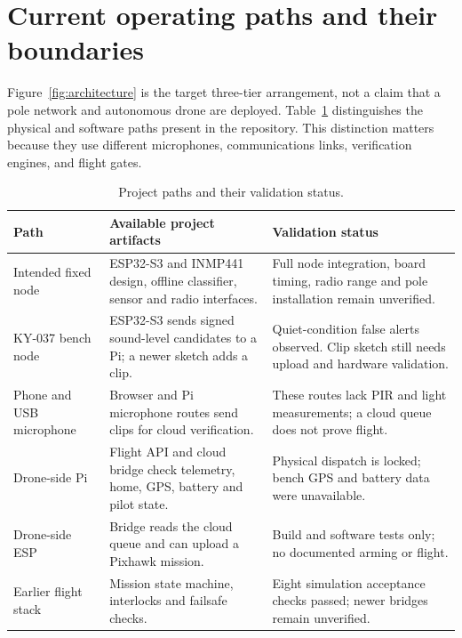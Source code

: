 \documentclass[12pt,a4paper]{report}
\begin{document}
\section{Current operating paths and their boundaries}
\label{sec:current-paths}

Figure~\ref{fig:architecture} is the target three-tier arrangement,
not a claim that a pole network and autonomous drone are deployed.
Table~\ref{tab:pathstatus} distinguishes the physical and software
paths present in the repository. This distinction matters because
they use different microphones, communications links, verification
engines, and flight gates.

\begin{table}[H]
\centering\small
\caption{Project paths and their validation status.}
\label{tab:pathstatus}
\begin{tabular}{|>{\raggedright\arraybackslash}p{}|>{\raggedright\arraybackslash}p{}|>{\raggedright\arraybackslash}p{}|}
\hline
\textbf{Path} & \textbf{Available project artifacts} & \textbf{Validation status}\\\hline
Intended fixed node & ESP32-S3 and INMP441 design, offline classifier, sensor and radio interfaces. & Full node integration, board timing, radio range and pole installation remain unverified.\\\hline
KY-037 bench node & ESP32-S3 sends signed sound-level candidates to a Pi; a newer sketch adds a clip. & Quiet-condition false alerts observed. Clip sketch still needs upload and hardware validation.\\\hline
Phone and USB microphone & Browser and Pi microphone routes send clips for cloud verification. & These routes lack PIR and light measurements; a cloud queue does not prove flight.\\\hline
Drone-side Pi & Flight API and cloud bridge check telemetry, home, GPS, battery and pilot state. & Physical dispatch is locked; bench GPS and battery data were unavailable.\\\hline
Drone-side ESP & Bridge reads the cloud queue and can upload a Pixhawk mission. & Build and software tests only; no documented arming or flight.\\\hline
Earlier flight stack & Mission state machine, interlocks and failsafe checks. & Eight simulation acceptance checks passed; newer bridges remain unverified.\\\hline
\end{tabular}
\end{table}
\end{document}
